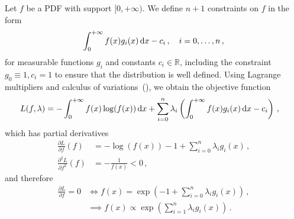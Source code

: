 \documentclass{article}
\newcommand{\R}{\mathbb{R}}
\newcommand{\dd}{{\rm d}}
\begin{document}
%
Let $f$ be a PDF with support $[0, +\infty)$.
We define $n + 1$ constraints on $f$ in the form
%
\begin{align*}
	\int_0^{+\infty} f(x) g_i(x) \, \dd x - c_i \,, \quad i = 0, \dots, n \,,
\end{align*}
%
for measurable functions $g_i$ and constants $c_i \in \R$,
including the constraint $g_0 \equiv 1, c_i = 1$
to ensure that the distribution is well defined.
Using Lagrange multipliers and
calculus of variations~(\cite{weinstock1974calculus}),
we obtain the objective function
%
\begin{align*}
	L(f, \lambda) &= -\int_0^{+\infty} f(x) \log(f(x)) \, \dd x
		+ \sum_{i=0}^n \lambda_i
		\left(\int_0^{+\infty} f(x) g_i(x) \, \dd x - c_i\right) \,,
\end{align*}
%
which has partial derivatives
%
\begin{align*}
	\frac{\partial L}{\partial f}(f)
		&= -\log (f(x)) - 1 + \sum_{i = 0}^n \lambda_i g_i(x) \,, \\
	\frac{\partial ^ 2 L}{\partial f ^ 2}(f)
		&= -\frac{1}{f(x)} < 0 \,,
\end{align*}
%
and therefore
%
\begin{align}
	\frac{\partial L}{\partial f} = 0 &\iff f(x)
		= \exp\left(-1 + \sum_{i = 0}^n \lambda_i g_i(x)\right)
		\,, \nonumber\\
	&\implies f(x) \propto \exp\left(\sum_{i = 1}^n \lambda_i g_i(x)\right) \,.
	\label{eq:p-prop}
\end{align}
%
\end{document}
